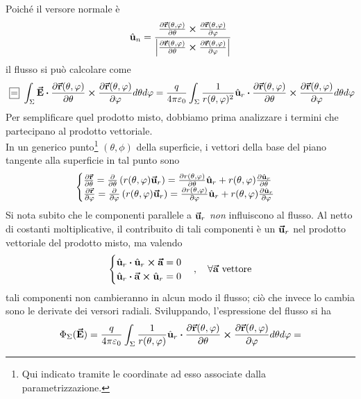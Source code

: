\begin{demonstration}
	Poiché il versore normale è
	\begin{equation*}
		\hat{\mathbf{u}}_n=\frac{\pdv{\vb*{\va{r}}(\theta,\varphi)}{\theta}\cross\pdv{\vb*{\va{r}}(\theta,\varphi)}{\varphi}}{\abs{\pdv{\vb*{\va{r}}(\theta,\varphi)}{\theta}\cross\pdv{\vb*{\va{r}}(\theta,\varphi)}{\varphi}}}
	\end{equation*}
	il flusso si può calcolare come
	\begin{equation*}
		\squarequal\int_{\Sigma}\vba{E}\vdot\pdv{\vba{r}(\theta,\phi)}{\theta}\cross\pdv{\vba{r}(\theta,\phi)}{\phi} d\theta d\phi=\frac{q}{4\pi\epsilon_0}\int_{\Sigma}\frac{1}{r(\theta,\phi)^2}\vbh{u}_r\vdot \pdv{\vba{r}(\theta,\phi)}{\theta}\cross\pdv{\vba{r}(\theta,\phi)}{\phi} d\theta d\phi
	\end{equation*}
	Per semplificare quel prodotto misto, dobbiamo prima analizzare i termini che partecipano al prodotto vettoriale.\\
	In un generico punto\footnote{Qui indicato tramite le coordinate ad esso associate dalla parametrizzazione.} $\left(\theta,\phi\right)$ della superficie, i vettori della base del piano tangente alla superficie in tal punto sono
	\begin{equation*}
		\begin{cases}
			\pdv{\vb*{\va{r}}}{\theta}=\pdv{\theta}\left(r(\theta,\varphi)\vb*{\va{u}}_r\right)=\pdv{r(\theta,\varphi)}{\theta}\hat{\mathbf{u}}_r+r(\theta,\varphi)\pdv{\hat{\mathbf{u}}_r}{\theta}\\
			\pdv{\vb*{\va{r}}}{\varphi}=\pdv{\varphi}\left(r(\theta,\varphi)\vb*{\va{u}}_r\right)=\pdv{r(\theta,\varphi)}{\varphi}\hat{\mathbf{u}}_r+r(\theta,\varphi)\pdv{\hat{\mathbf{u}}_r}{\varphi}\\
		\end{cases}
	\end{equation*}
	Si nota subito che  le componenti parallele a $\vb*{\va{u}}_r$ \textit{non} influiscono al flusso. Al netto di costanti moltiplicative, il contribuito di tali componenti è un $\vb*{\va{u}}_r$ nel prodotto vettoriale del prodotto misto, ma valendo
\begin{equation*}
	\begin{cases}
		\vbh{u}_r\vdot\vbh{u}_r\cross\vba{a}=0\\
		\vbh{u}_r\vdot\vba{a}\cross\vbh{u}_r=0
	\end{cases},\quad\forall \vba{a}\text{ vettore}
\end{equation*}
tali componenti non cambieranno in alcun modo il flusso; ciò che invece lo cambia sono le derivate dei versori radiali. Sviluppando, l'espressione del flusso si ha
\begin{align*}
	\Phi_{\Sigma}(\vba{E})&=\frac{q}{4\pi\epsilon_0}\int_{\Sigma}\frac{1}{r(\theta,\phi)}\vbh{u}_r\vdot \pdv{\vba{r}(\theta,\phi)}{\theta}\cross\pdv{\vba{r}(\theta,\phi)}{\phi} d\theta d\phi=\\

\end{align*}
\end{demonstration}
